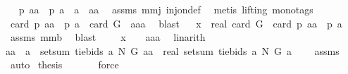 \begin{isabellebody}
\isamarkupfalse%
\ \isamarkupfalse%
\ {\isachardoublequoteopen}{\isacharquery}p\ aa\ {\isacharequal}\ {\isacharquery}p\ a\ {\isasymlongrightarrow}\ a\ {\isacharequal}\ aa{\isachardoublequoteclose}\ \isamarkupfalse%
\ assms\ mm{}{}j\ inj{\isacharunderscore}on{\isacharunderscore}def\ \isanewline
{}\isamarkupfalse%
\ {\isacharparenleft}metis\ {\isacharparenleft}lifting{\isacharcomma}\ mono{\isacharunderscore}tags{\isacharparenright}{\isacharparenright}\isanewline
{}\isamarkupfalse%
\ \isamarkupfalse%
\ {\isachardoublequoteopen}card\ {\isacharparenleft}{\isacharquery}p\ aa\ {\isasyminter}\ {\isacharparenleft}{\isacharquery}p\ a{\isacharparenright}{\isacharparenright}\ {\isacharequal}\ card\ G\ {\isasymlongleftrightarrow}\ {\isacharparenleft}a{\isacharequal}aa{\isacharparenright}{\isachardoublequoteclose}\ \isamarkupfalse%
\ blast\isanewline
{}\isamarkupfalse%
\ \isamarkupfalse%
\ {\isachardoublequoteopen}x\ {\isacharequal}\ real\ {\isacharparenleft}card\ G{\isacharparenright}\ {\isacharminus}\ card\ {\isacharparenleft}{\isacharquery}p\ aa\ {\isasyminter}\ {\isacharparenleft}{\isacharquery}p\ a{\isacharparenright}{\isacharparenright}{\isachardoublequoteclose}\ \isamarkupfalse%
\ assms\ mm{}{}b\ \isamarkupfalse%
\ blast\isanewline
{}\isamarkupfalse%
\ \isamarkupfalse%
\ \isanewline
{}{\isacharcolon}\ {\isachardoublequoteopen}x\ {\isacharequal}\ {}\ {\isasymlongleftrightarrow}\ {\isacharparenleft}a{\isacharequal}aa{\isacharparenright}{\isachardoublequoteclose}\ \isamarkupfalse%
\ linarith\ \isamarkupfalse%
\ \isamarkupfalse%
\ \isanewline
{\isachardoublequoteopen}aa\ {\isasymnoteq}\ a\ {\isasymlongrightarrow}\ setsum\ {\isacharparenleft}tiebids{\isacharprime}\ a\ N\ G{\isacharparenright}\ aa\ {\isacharless}\ real\ {\isacharparenleft}setsum\ {\isacharparenleft}tiebids{\isacharprime}\ a\ N\ G{\isacharparenright}\ a{\isacharparenright}{\isachardoublequoteclose}\ \isamarkupfalse%
\ {}\ {}\ assms\ \isanewline
{}\isamarkupfalse%
\ auto\isanewline
{}\isamarkupfalse%
\ {\isacharquery}thesis\ \isamarkupfalse%
\ {}\ {}\ {}\ \isamarkupfalse%
\ force\isanewline
{}\isamarkupfalse%

\end{isabellebody}
